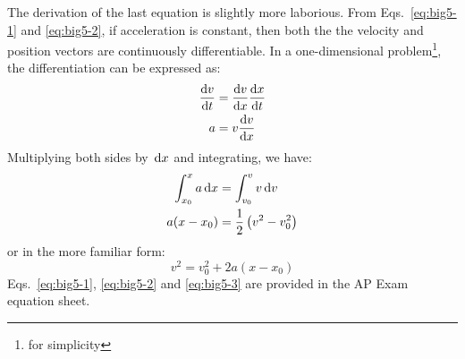 \documentclass{../../oss-handout}
\begin{document}
The derivation of the last equation is slightly more laborious. From
Eqs.~\ref{eq:big5-1} and \ref{eq:big5-2}, if acceleration is constant, then
both the the velocity and position vectors are continuously differentiable. In
a one-dimensional problem\footnote{for simplicity}, the differentiation can be
expressed as:
\begin{align*}
  \diff vt&=\diff vx\diff xt\\
  a&=v\diff vx
\end{align*}
Multiplying both sides by $\dl x$ and integrating, we have:
\begin{align*}
  \int_{x_0}^x a\dl x&=\int_{v_0}^v v\dl v\\
  a(x-x_0)&=\frac12\left(v^2-v_0^2\right)
\end{align*}
or in the more familiar form:
\begin{equation}
  \boxed{v^2 = v_0^2+ 2a(x-x_0)}
  \label{eq:big5-3}
\end{equation}
Eqs.~\ref{eq:big5-1}, \ref{eq:big5-2} and \ref{eq:big5-3} are provided in the
AP Exam equation sheet.
%  
%
\end{document}
